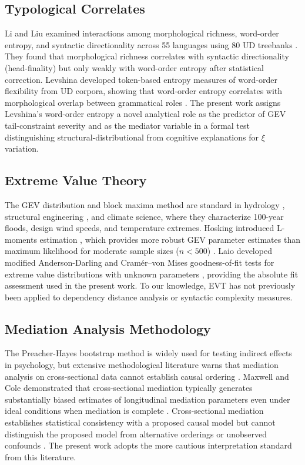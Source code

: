 \documentclass[11pt,letterpaper]{article}
\begin{document}
\subsection{Typological Correlates}

Li and Liu examined interactions among morphological richness, word-order entropy, and syntactic directionality across 55 languages using 80 UD treebanks \cite{Li2025}. They found that morphological richness correlates with syntactic directionality (head-finality) but only weakly with word-order entropy after statistical correction. Levshina developed token-based entropy measures of word-order flexibility from UD corpora, showing that word-order entropy correlates with morphological overlap between grammatical roles \cite{Levshina2019}. The present work assigns Levshina's word-order entropy a novel analytical role as the predictor of GEV tail-constraint severity and as the mediator variable in a formal test distinguishing structural-distributional from cognitive explanations for $\xi$ variation.

\subsection{Extreme Value Theory}

The GEV distribution and block maxima method are standard in hydrology \cite{Coles2001, Hosking1997}, structural engineering \cite{Coles2001}, and climate science, where they characterize 100-year floods, design wind speeds, and temperature extremes. Hosking introduced L-moments estimation \cite{Hosking1990}, which provides more robust GEV parameter estimates than maximum likelihood for moderate sample sizes ($n < 500$) \cite{Hosking1997}. Laio developed modified Anderson-Darling and Cram\'er--von Mises goodness-of-fit tests for extreme value distributions with unknown parameters \cite{Laio2004}, providing the absolute fit assessment used in the present work. To our knowledge, EVT has not previously been applied to dependency distance analysis or syntactic complexity measures.

\subsection{Mediation Analysis Methodology}

The Preacher-Hayes bootstrap method \cite{Preacher2015} is widely used for testing indirect effects in psychology, but extensive methodological literature warns that mediation analysis on cross-sectional data cannot establish causal ordering \cite{Maxwell2007}. Maxwell and Cole demonstrated that cross-sectional mediation typically generates substantially biased estimates of longitudinal mediation parameters even under ideal conditions when mediation is complete \cite{Maxwell2007}. Cross-sectional mediation establishes statistical consistency with a proposed causal model but cannot distinguish the proposed model from alternative orderings or unobserved confounds \cite{Preacher2015, Maxwell2007}. The present work adopts the more cautious interpretation standard from this literature.
\end{document}

